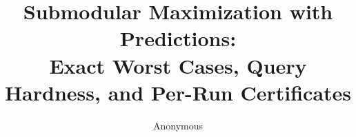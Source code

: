\documentclass{article} %
\title{Submodular Maximization with Predictions:\\
Exact Worst Cases, Query Hardness, and Per-Run Certificates}
\author{Anonymous}
\begin{document}
\maketitle

\begin{abstract}
\end{abstract}
\end{document}

